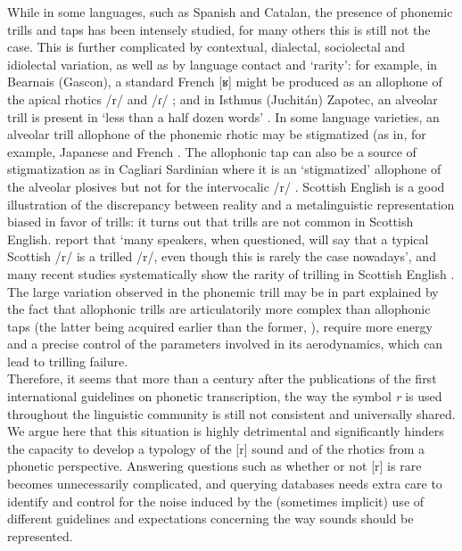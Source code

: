 While in some languages, such as Spanish and Catalan, the presence of phonemic trills and taps has been intensely studied, for many others this is still not the case. This is further complicated by contextual, dialectal, sociolectal and idiolectal variation, as well as by language contact and ‘rarity’: for example, in Bearnais (Gascon), a standard French [ʁ] might be produced as an allophone of the apical rhotics /r/ and /ɾ/  \parencite{mooneyBearnaisGascon2014}; and in Isthmus (Juchitán) Zapotec, an alveolar trill is present in ‘less than a half dozen words’ \parencite[366]{pickettIsthmusJuchitanZapotec2010}. In some language varieties, an alveolar trill allophone of the phonemic rhotic may be stigmatized (as in, for example, Japanese \parencite{labrunePhonologyJapanese2012,ooigawaPerceptionItalianLiquids2015,vanceSoundsJapanese2008} and French  \parencite{prematRouleFrancaisDans2018}. The allophonic tap can also be a source of stigmatization as in Cagliari Sardinian where it is an ‘stigmatized’ allophone of the alveolar plosives but not for the intervocalic /r/ \parencite{mereuCagliariSardinian2019}. Scottish English is a good illustration of the discrepancy between reality and a metalinguistic representation biased in favor of trills: it turns out that trills are not common in Scottish English. \textcite[57]{lawsonSocioArticulatoryStudyScottish2014} report that ‘many speakers, when questioned, will say that a typical Scottish /r/ is a trilled /r/, even though this is rarely the case nowadays’, and many recent studies systematically show the rarity of trilling in Scottish English \parencite{pukliInvestigationSociophonetiqueAnglais2006,stuart-smithDerhoticisationScottishEnglish2014,jauriberryRhotiquesRhoticiteEcosse2016}. The large variation observed in the phonemic trill may be in part explained by the fact that allophonic trills are articulatorily more complex than allophonic taps (the latter being acquired earlier than the former, \parencite{mcleodChildrenConsonantAcquisition2018}), require more energy and a precise control of the parameters involved in its aerodynamics, which can lead to trilling failure.\\

Therefore, it seems that more than a century after the publications of the first international guidelines on phonetic transcription, the way the symbol \textit{r} is used throughout the linguistic community is still not consistent and universally shared. We argue here that this situation is highly detrimental and significantly hinders the capacity to develop a typology of the [r] sound and of the rhotics from a phonetic perspective. Answering questions such as whether or not [r] is rare becomes unnecessarily complicated, and querying databases needs extra care to identify and control for the noise induced by the (sometimes implicit) use of different guidelines and expectations concerning the way sounds should be represented.

